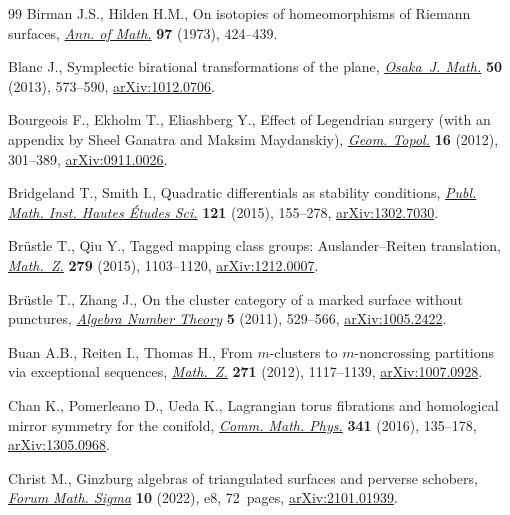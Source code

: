 \documentclass[pdftex]{sigma}
\theoremstyle{definition}
\numberwithin{equation}{section}
\begin{document}
\begin{thebibliography}{99}
Birman J.S., Hilden H.M., On isotopies of homeomorphisms of {R}iemann surfaces,
 \href{https://doi.org/10.2307/1970830}{\textit{Ann. of Math.}} \textbf{97}
 (1973), 424--439.

Blanc J., Symplectic birational transformations of the plane,
 \href{https://doi.org/10.18910/25084}{\textit{Osaka~J. Math.}} \textbf{50}
 (2013), 573--590, \href{http://arxiv.org/abs/1012.0706}{arXiv:1012.0706}.

Bourgeois F., Ekholm T., Eliashberg Y., Effect of {L}egendrian surgery (with an
 appendix by {S}heel {G}anatra and {M}aksim {M}aydanskiy),
 \href{https://doi.org/10.2140/gt.2012.16.301}{\textit{Geom. Topol.}}
 \textbf{16} (2012), 301--389,
 \href{http://arxiv.org/abs/0911.0026}{arXiv:0911.0026}.

Bridgeland T., Smith I., Quadratic differentials as stability conditions,
 \href{https://doi.org/10.1007/s10240-014-0066-5}{\textit{Publ. Math. Inst.
 Hautes \'{E}tudes Sci.}} \textbf{121} (2015), 155--278,
 \href{http://arxiv.org/abs/1302.7030}{arXiv:1302.7030}.

Br\"{u}stle T., Qiu Y., Tagged mapping class groups: {A}uslander--{R}eiten
 translation,
 \href{https://doi.org/10.1007/s00209-015-1405-z}{\textit{Math.~Z.}}
 \textbf{279} (2015), 1103--1120,
 \href{http://arxiv.org/abs/1212.0007}{arXiv:1212.0007}.

Br\"{u}stle T., Zhang J., On the cluster category of a marked surface without
 punctures, \href{https://doi.org/10.2140/ant.2011.5.529}{\textit{Algebra
 Number Theory}} \textbf{5} (2011), 529--566,
 \href{http://arxiv.org/abs/1005.2422}{arXiv:1005.2422}.

Buan A.B., Reiten I., Thomas H., From {$m$}-clusters to {$m$}-noncrossing
 partitions via exceptional sequences,
 \href{https://doi.org/10.1007/s00209-011-0906-7}{\textit{Math.~Z.}}
 \textbf{271} (2012), 1117--1139,
 \href{http://arxiv.org/abs/1007.0928}{arXiv:1007.0928}.

Chan K., Pomerleano D., Ueda K., Lagrangian torus fibrations and homological
 mirror symmetry for the conifold,
 \href{https://doi.org/10.1007/s00220-015-2477-7}{\textit{Comm. Math. Phys.}}
 \textbf{341} (2016), 135--178,
 \href{http://arxiv.org/abs/1305.0968}{arXiv:1305.0968}.

Christ M., Ginzburg algebras of triangulated surfaces and perverse schobers,
 \href{https://doi.org/10.1017/fms.2022.1}{\textit{Forum Math. Sigma}}
 \textbf{10} (2022), e8, 72~pages,
 \href{http://arxiv.org/abs/2101.01939}{arXiv:2101.01939}.


\end{thebibliography}
\end{document}
